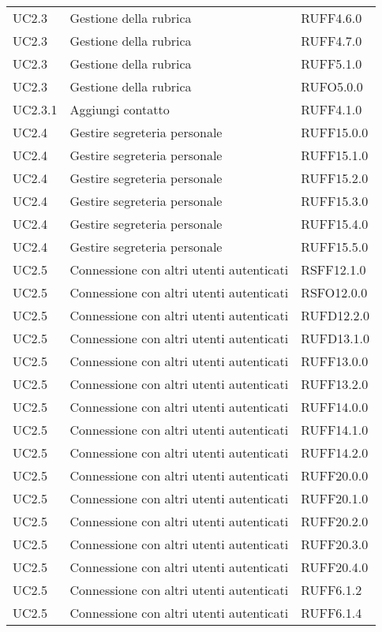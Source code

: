 \begin{longtable}{lp{}l}
UC2.3 & Gestione della rubrica & RUFF4.6.0 \\
UC2.3 & Gestione della rubrica & RUFF4.7.0 \\
UC2.3 & Gestione della rubrica & RUFF5.1.0 \\
UC2.3 & Gestione della rubrica & RUFO5.0.0 \\
UC2.3.1 & Aggiungi contatto & RUFF4.1.0 \\
UC2.4 & Gestire segreteria personale & RUFF15.0.0 \\
UC2.4 & Gestire segreteria personale & RUFF15.1.0 \\
UC2.4 & Gestire segreteria personale & RUFF15.2.0 \\
UC2.4 & Gestire segreteria personale & RUFF15.3.0 \\
UC2.4 & Gestire segreteria personale & RUFF15.4.0 \\
UC2.4 & Gestire segreteria personale & RUFF15.5.0 \\
UC2.5 & Connessione con altri utenti autenticati & RSFF12.1.0 \\
UC2.5 & Connessione con altri utenti autenticati & RSFO12.0.0 \\
UC2.5 & Connessione con altri utenti autenticati & RUFD12.2.0 \\
UC2.5 & Connessione con altri utenti autenticati & RUFD13.1.0 \\
UC2.5 & Connessione con altri utenti autenticati & RUFF13.0.0 \\
UC2.5 & Connessione con altri utenti autenticati & RUFF13.2.0 \\
UC2.5 & Connessione con altri utenti autenticati & RUFF14.0.0 \\
UC2.5 & Connessione con altri utenti autenticati & RUFF14.1.0 \\
UC2.5 & Connessione con altri utenti autenticati & RUFF14.2.0 \\
UC2.5 & Connessione con altri utenti autenticati & RUFF20.0.0 \\
UC2.5 & Connessione con altri utenti autenticati & RUFF20.1.0 \\
UC2.5 & Connessione con altri utenti autenticati & RUFF20.2.0 \\
UC2.5 & Connessione con altri utenti autenticati & RUFF20.3.0 \\
UC2.5 & Connessione con altri utenti autenticati & RUFF20.4.0 \\
UC2.5 & Connessione con altri utenti autenticati & RUFF6.1.2 \\
UC2.5 & Connessione con altri utenti autenticati & RUFF6.1.4 \\

\end{longtable}

